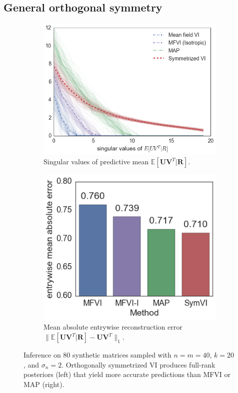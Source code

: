 \documentclass{article}
\newcommand{\E}{\mathbb{E}}
\renewcommand{\v}[1]{\mathbf{#1}}
\begin{document}

\subsection{General orthogonal symmetry}
\begin{figure}[t]
\centering
\begin{subfigure}[t]{.5\textwidth}
\includegraphics[width=\textwidth]{rot_sv_plot}
\caption{Singular values of predictive mean $\E[\v{U}\v{V}^T |
  \v{R}]$. }
\label{fig:rot_svs}
\end{subfigure}
\begin{subfigure}[t]{.45\textwidth}
\includegraphics[width=\textwidth]{rot_error_barplot}
\caption{Mean absolute entrywise reconstruction error $\|\E[\v{U}\v{V}^T | \v{R}] - \v{U}\v{V}^T
  \|_1$.}
\label{fig:rot_error}
\end{subfigure}
\caption{Inference on 80 synthetic matrices sampled with $n=m=40$, $k=20$, and $\sigma_n
  = 2$. Orthogonally symmetrized VI produces full-rank
  posteriors (left) that yield more accurate predictions than MFVI or
  MAP (right).}
\end{figure}
\end{document}
